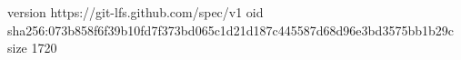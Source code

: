 version https://git-lfs.github.com/spec/v1
oid sha256:073b858f6f39b10fd7f373bd065c1d21d187c445587d68d96e3bd3575bb1b29c
size 1720
